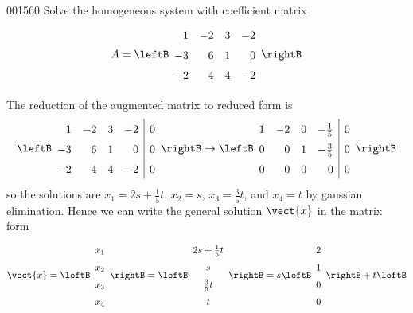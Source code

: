 \begin{example}{}{001560}
Solve the homogeneous system with coefficient matrix
\begin{equation*}
A = 
\leftB \begin{array}{rrrr}
 	 1 & -2 & 3 & -2 \\
	-3 & 6 & 1 & 0 \\
	-2 & 4 & 4 & -2 \\
\end{array} \rightB
\end{equation*}
\begin{solution}
  The reduction of the augmented matrix to reduced form is
\begin{equation*}
\leftB \begin{array}{rrrr|r}
	1 & -2 & 3 & -2 & 0 \\
	-3 & 6 & 1 &  0 & 0 \\
	-2 & 4 & 4 & -2 & 0 \\
\end{array} \rightB
\rightarrow
\def\arraystretch{1.5}
\leftB \begin{array}{rrrr|r}
	1 & -2 & 0 & -\frac{1}{5} & 0 \\
	0 & 0 & 1 & -\frac{3}{5} & 0 \\
	0 & 0 & 0 & 0 & 0 \\
\end{array} \rightB
\end{equation*}
so the solutions are $x_1 = 2s + \frac{1}{5}t$, $x_2 = s$, $x_3 = \frac{3}{5}t$, and $x_4 = t$ by gaussian elimination. Hence we can write the general solution $\vect{x}$ in the matrix form
\begin{equation*}
	\vect{x} =
	\leftB \begin{array}{r}
		x_1 \\
		x_2 \\
		x_3 \\
		x_4
	\end{array} \rightB
	=
	\leftB \begin{array}{c}
		2s + \frac{1}{5}t \\
		s \\
		\frac{3}{5}t \\
		t
	\end{array} \rightB
	= s
	\leftB \begin{array}{r}
		2 \\
		1 \\
		0 \\
		0
	\end{array} \rightB
	+ t
	\leftB \begin{array}{r}

\end{array}
\end{equation*}
\end{solution}
\end{example}
